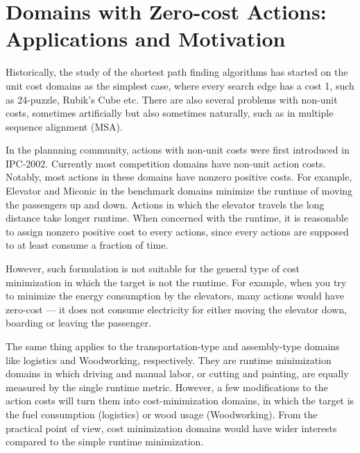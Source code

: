 \section{Domains with Zero-cost Actions: Applications and Motivation}


Historically, the study of the shortest path finding algorithms has
started on the unit cost domains as the simplest case, where every
search edge has a cost 1,
such as 24-puzzle, Rubik's Cube etc.
There are also several problems with non-unit costs, sometimes
artificially but also sometimes naturally, such as in multiple
sequence alignment (MSA).

In the plannning community, actions with non-unit costs were first introduced in 
IPC-2002. Currently most competition domains have non-unit action costs.
Notably, most actions in these domains have nonzero positive costs.
% 
% 
% 
For example, Elevator and Miconic in the benchmark domains minimize the
runtime of moving the passengers up and down.  Actions in which the
elevator travels the long distance take longer runtime.  When concerned
with the runtime, it is reasonable to assign nonzero positive cost to
every actions, since every actions are supposed to at least consume a
fraction of time.

However, such formulation is not suitable for the general type of cost
minimization in which the target is not the runtime.  For example, when
you try to minimize the energy consumption by the elevators, many
actions would have zero-cost --- it does not consume electricity for
either moving the elevator down, boarding or leaving the passenger.
 
The same thing applies to the transportation-type and assembly-type
domains like logistics and Woodworking, respectively. They are runtime
minimization domains in which driving and manual labor, or cutting and
painting, are equally measured by the single runtime metric.
% 
However, a few modifications to the action costs will turn them into
cost-minimization domains, in which the target is the fuel consumption
(logistics) or wood usage (Woodworking). From the practical point of
view, cost minimization domains would have wider interests compared to
the simple runtime minimization.

